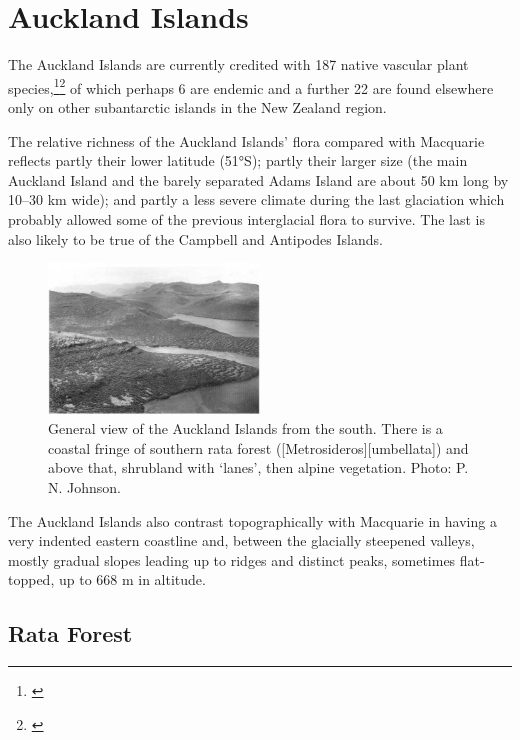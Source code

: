 \section{Auckland Islands}

The Auckland Islands are currently credited with 187 native vascular plant species,\footnote{\cite{meurk1982supplementary}}\footnote{\cite{johnson1975vascular}} of which perhaps 6 are endemic and a further 22 are found elsewhere only on other subantarctic islands in the New Zealand region.

The relative richness of the Auckland Islands' flora compared with Macquarie reflects partly their lower latitude (51°S); partly their larger size (the main Auckland Island and the barely separated Adams Island are about 50 km long by 10--30 km wide); and partly a less severe climate during the last glaciation which probably allowed some of the previous interglacial flora to survive.
The last is also likely to be true of the Campbell and Antipodes Islands.

\begin{figure}
	\includegraphics[width=0.5\textwidth]{graphics/figure116auckland-islands.jpg}
	\centering
	\caption[General view of the Auckland Islands from the south]{General view of the Auckland Islands from the south.
	There is a coastal fringe of southern rata forest ([Metrosideros][umbellata]) and above that, shrubland with `lanes', then alpine vegetation.
	Photo: P. N. Johnson.}%
	\label{fig:116auckland-islands}
\end{figure}

The Auckland Islands also contrast topographically with Macquarie in having a very indented eastern coastline and, between the glacially steepened valleys, mostly gradual slopes leading up to ridges and distinct peaks, sometimes flat-topped, up to 668 m in altitude.

\subsection{Rata Forest}

